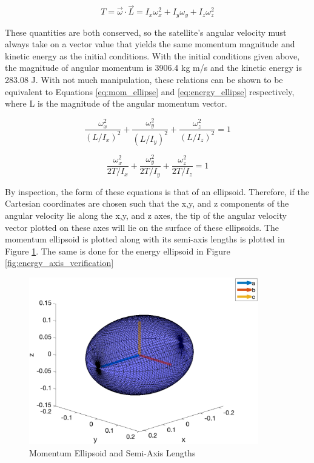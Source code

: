 \begin{equation} \label{eq:rot_KE}
    T = \vec{\omega} \cdot \vec{L} = I_x \omega_x^2 + I_y \omega_y + I_z \omega_z^2
\end{equation}

These quantities are both conserved, so the satellite's angular velocity must always take on a vector value that yields the same momentum magnitude and kinetic energy as the initial conditions. With the initial conditions given above, the magnitude of angular momentum is 3906.4 kg m/s and the kinetic energy is 283.08 J. With not much manipulation, these relations can be shown to be equivalent to Equations \ref{eq:mom_ellipse} and \ref{eq:energy_ellipse} respectively, where L is the magnitude of the angular momentum vector.  

\begin{equation} \label{eq:mom_ellipse}
    \frac{\omega_x^2}{(L/I_x)^2} + \frac{\omega_y^2}{(L/I_y)^2} + \frac{\omega_z^2}{(L/I_z)^2} = 1
\end{equation}

\begin{equation} \label{eq:energy_ellipse}
    \frac{\omega_x^2}{2T/I_x} + \frac{\omega_y^2}{2T/I_y} + \frac{\omega_z^2}{2T/I_z} = 1
\end{equation}

By inspection, the form of these equations is that of an ellipsoid. Therefore, if the Cartesian coordinates are chosen such that the x,y, and z components of the angular velocity lie along the x,y, and z axes, the tip of the angular velocity vector plotted on these axes will lie on the surface of these ellipsoids. The momentum ellipsoid is plotted along with its semi-axis lengths is plotted in Figure \ref{fig:momentum_axis_verification}. The same is done for the energy ellipsoid in Figure \ref{fig:energy_axis_verification}

\begin{figure}[H]
    \centering
    \includegraphics[width = 10cm]{Images/momentum_axes_random.png}
    \caption{Momentum Ellipsoid and Semi-Axis Lengths}
    \label{fig:momentum_axis_verification}
\end{figure}

